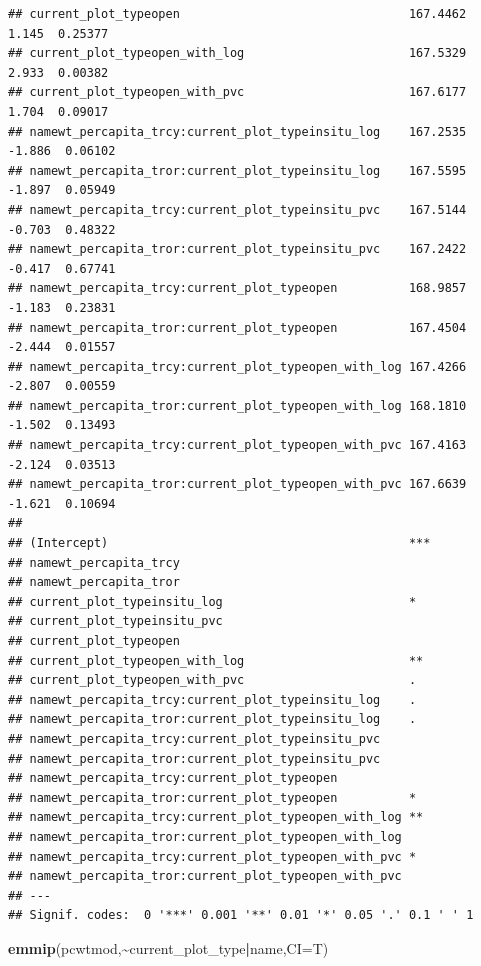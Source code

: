 \documentclass[
]{article}
\newenvironment{Shaded}{\begin{snugshade}}{\end{snugshade}}
\newcommand{\AttributeTok}[1]{\textcolor[rgb]{0.13,0.29,0.53}{#1}}
\newcommand{\FunctionTok}[1]{\textcolor[rgb]{0.13,0.29,0.53}{\textbf{#1}}}
\newcommand{\NormalTok}[1]{#1}
\newcommand{\SpecialCharTok}[1]{\textcolor[rgb]{0.81,0.36,0.00}{\textbf{#1}}}
\begin{document}
\begin{verbatim}
## current_plot_typeopen                                167.4462   1.145  0.25377
## current_plot_typeopen_with_log                       167.5329   2.933  0.00382
## current_plot_typeopen_with_pvc                       167.6177   1.704  0.09017
## namewt_percapita_trcy:current_plot_typeinsitu_log    167.2535  -1.886  0.06102
## namewt_percapita_tror:current_plot_typeinsitu_log    167.5595  -1.897  0.05949
## namewt_percapita_trcy:current_plot_typeinsitu_pvc    167.5144  -0.703  0.48322
## namewt_percapita_tror:current_plot_typeinsitu_pvc    167.2422  -0.417  0.67741
## namewt_percapita_trcy:current_plot_typeopen          168.9857  -1.183  0.23831
## namewt_percapita_tror:current_plot_typeopen          167.4504  -2.444  0.01557
## namewt_percapita_trcy:current_plot_typeopen_with_log 167.4266  -2.807  0.00559
## namewt_percapita_tror:current_plot_typeopen_with_log 168.1810  -1.502  0.13493
## namewt_percapita_trcy:current_plot_typeopen_with_pvc 167.4163  -2.124  0.03513
## namewt_percapita_tror:current_plot_typeopen_with_pvc 167.6639  -1.621  0.10694
##                                                         
## (Intercept)                                          ***
## namewt_percapita_trcy                                   
## namewt_percapita_tror                                   
## current_plot_typeinsitu_log                          *  
## current_plot_typeinsitu_pvc                             
## current_plot_typeopen                                   
## current_plot_typeopen_with_log                       ** 
## current_plot_typeopen_with_pvc                       .  
## namewt_percapita_trcy:current_plot_typeinsitu_log    .  
## namewt_percapita_tror:current_plot_typeinsitu_log    .  
## namewt_percapita_trcy:current_plot_typeinsitu_pvc       
## namewt_percapita_tror:current_plot_typeinsitu_pvc       
## namewt_percapita_trcy:current_plot_typeopen             
## namewt_percapita_tror:current_plot_typeopen          *  
## namewt_percapita_trcy:current_plot_typeopen_with_log ** 
## namewt_percapita_tror:current_plot_typeopen_with_log    
## namewt_percapita_trcy:current_plot_typeopen_with_pvc *  
## namewt_percapita_tror:current_plot_typeopen_with_pvc    
## ---
## Signif. codes:  0 '***' 0.001 '**' 0.01 '*' 0.05 '.' 0.1 ' ' 1
\end{verbatim}

\begin{Shaded}
\begin{Highlighting}[]
\FunctionTok{emmip}\NormalTok{(pcwtmod,}\SpecialCharTok{\textasciitilde{}}\NormalTok{current\_plot\_type}\SpecialCharTok{|}\NormalTok{name,}\AttributeTok{CI=}\NormalTok{T)}
\end{Highlighting}
\end{Shaded}
\end{document}
